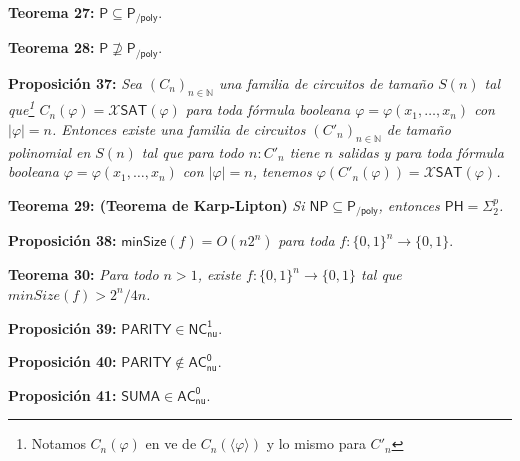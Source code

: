 \documentclass{article}
\begin{document}
\begin{flushleft}
  \textbf{Teorema 27:}
  $\mathsf{P \subseteq P_{/poly}}$.
\end{flushleft}

\begin{flushleft}
  \textbf{Teorema 28:}
  $\mathsf{P \nsupseteq P_{/poly}}$.
\end{flushleft}

\begin{flushleft}
  \textbf{Proposición 37:}
  \textit{Sea $(C_n)_{n \in \mathbb{N}}$ una familia de circuitos de tamaño $S(n)$ tal que\footnote{Notamos
  $C_n(\varphi)$ en ve de $C_n(\langle \varphi \rangle)$ y lo mismo para $C'_n$} $C_n(\varphi) = \mathcal{X}
  \mathsf{SAT}(\varphi)$ para toda fórmula booleana $\varphi = \varphi(x_1, \dots , x_n)$ con $|\varphi| = n$.
  Entonces existe una familia de circuitos $(C'_n)_{n \in \mathbb{N}}$ de tamaño polinomial en $S(n)$ tal que
  para todo $n: C'_n$ tiene $n$ salidas y para toda fórmula booleana $\varphi = \varphi(x_1, \dots, x_n)$ 
  con $|\varphi| = n$, tenemos $\varphi(C'_n(\varphi)) = \mathcal{X}\mathsf{SAT}(\varphi)$.}
\end{flushleft}

\begin{flushleft}
  \textbf{Teorema 29: \hypertarget{karpLipton}{\textcolor{Bittersweet}{(Teorema de Karp-Lipton)}}}
  \textit{Si $\mathsf{NP \subseteq P_{/poly}}$, entonces $\mathsf{PH} = \Sigma^p_2$.}
\end{flushleft}

\begin{flushleft}
  \textbf{Proposición 38:}
  $\mathsf{minSize}(f) = O(n2^n)$ \textit{para toda} $f : \{0,1\}^n \rightarrow \{0,1\}$.
\end{flushleft}

\begin{flushleft}
  \textbf{Teorema 30:}
  \textit{Para todo $n > 1$, existe $f : \{0,1\}^n \rightarrow \{0,1\}$ tal que $minSize(f) > 2^n / 4n$.}
\end{flushleft}

\begin{flushleft}
  \textbf{Proposición 39:}
  $\mathsf{PARITY \in NC^1_{nu}}$.
\end{flushleft}

\begin{flushleft}
  \textbf{Proposición 40:}
  $\mathsf{PARITY \not\in AC^0_{nu}}$.
\end{flushleft}

\begin{flushleft}
  \textbf{Proposición 41:}
  $\mathsf{SUMA \in AC^0_{nu}}$.
\end{flushleft}
\end{document}
